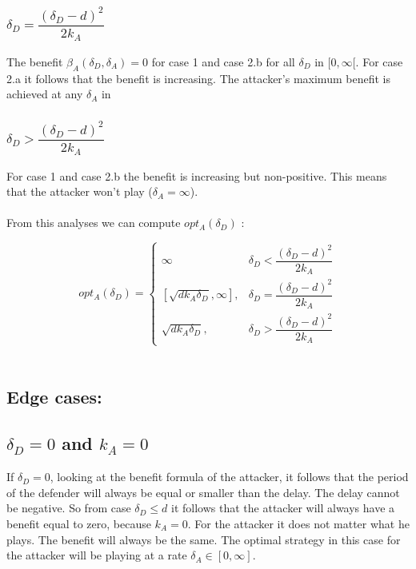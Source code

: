 \subsubsection*{$\delta_{D} = \dfrac{(\delta_{D}-d)^{2}}{2k_{A}}$} 
The benefit $\beta_{A}(\delta_{D},\delta_{A})=0$ for case 1 and case 2.b for all $\delta_{D}$ in $[0, \infty [$. For case 2.a it follows that the benefit is increasing. The attacker's maximum benefit is achieved at any $\delta_{A} $ in 
\subsubsection*{$\delta_{D} > \dfrac{(\delta_{D}-d)^{2}}{2k_{A}}$} 
For case 1 and case 2.b the benefit is increasing but non-positive. This means that the attacker won't play ($\delta_{A} = \infty$). 
\\
~~\\
From this analyses we can compute $opt_{A}(\delta_{D})$ : 

 \begin{displaymath}
  opt_{A}(\delta_{D}) = \left\{
     \begin{array}{lr}
            \infty & \delta_{D} < \dfrac{(\delta_{D}-d)^{2}}{2k_{A}} \\
       \left[ \sqrt{d k_{A}\delta_{D}}, \infty\right],  & \delta_{D} = \dfrac{(\delta_{D}-d)^{2}}{2k_{A}} \\
       \sqrt{d k_{A}\delta_{D}}, & \delta_{D} > \dfrac{(\delta_{D}-d)^{2}}{2k_{A}}
     \end{array}
   \right.
\end{displaymath}
\\

\subsection*{Edge cases:}

\subsection*{$\delta_{D}=0$ and $k_{A}=0$}
If $\delta_{D}=0$, looking at the benefit formula of the attacker, it follows that the period of the defender will always be equal or smaller than the delay. The delay cannot be negative. So from case $\delta_{D} \leq d$ it follows that the attacker will always have a benefit equal to zero, because $k_{A}=0$. For the attacker it does not matter what he plays. The benefit will always be the same. The optimal strategy in this case for the attacker will be playing at a rate $\delta_{A} \in [0,\infty ]$.


